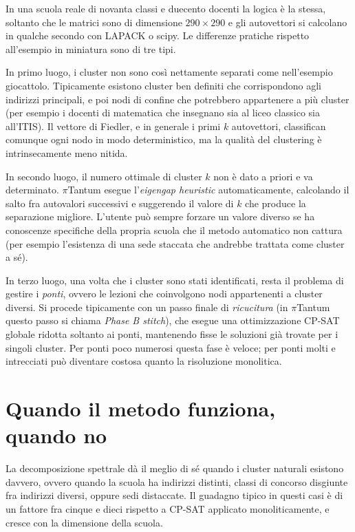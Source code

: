 In una scuola reale di novanta classi e duecento docenti la
logica \`e la stessa, soltanto che le matrici sono di
dimensione $290 \times 290$ e gli autovettori si calcolano
in qualche secondo con LAPACK o scipy. Le differenze
pratiche rispetto all'esempio in miniatura sono di tre
tipi.

In primo luogo, i cluster non sono cos\`i nettamente
separati come nell'esempio giocattolo. Tipicamente esistono
cluster ben definiti che corrispondono agli indirizzi
principali, e poi nodi di confine che potrebbero
appartenere a pi\`u cluster (per esempio i docenti di
matematica che insegnano sia al liceo classico sia
all'ITIS). Il vettore di Fiedler, e in generale i primi $k$
autovettori, classifican comunque ogni nodo in modo
deterministico, ma la qualit\`a del clustering \`e
intrinsecamente meno nitida.

In secondo luogo, il numero ottimale di cluster $k$ non \`e
dato a priori e va determinato. $\pi$Tantum esegue
l'\emph{eigengap heuristic} automaticamente, calcolando il
salto fra autovalori successivi e suggerendo il valore di
$k$ che produce la separazione migliore. L'utente pu\`o
sempre forzare un valore diverso se ha conoscenze specifiche
della propria scuola che il metodo automatico non cattura
(per esempio l'esistenza di una sede staccata che andrebbe
trattata come cluster a s\'e).

In terzo luogo, una volta che i cluster sono stati
identificati, resta il problema di gestire i \emph{ponti},
ovvero le lezioni che coinvolgono nodi appartenenti a
cluster diversi. Si procede tipicamente con un passo finale
di \emph{ricucitura} (in $\pi$Tantum questo passo si chiama
\emph{Phase B stitch}), che esegue una ottimizzazione CP-SAT
globale ridotta soltanto ai ponti, mantenendo fisse le
soluzioni gi\`a trovate per i singoli cluster. Per ponti
poco numerosi questa fase \`e veloce; per ponti molti e
intrecciati pu\`o diventare costosa quanto la risoluzione
monolitica.

\section{Quando il metodo funziona, quando no}

\begin{ideabox}
La decomposizione spettrale d\`a il meglio di s\'e quando i
cluster naturali esistono davvero, ovvero quando la scuola
ha indirizzi distinti, classi di concorso disgiunte fra
indirizzi diversi, oppure sedi distaccate. Il guadagno
tipico in questi casi \`e di un fattore fra cinque e dieci
rispetto a CP-SAT applicato monoliticamente, e cresce con la
dimensione della scuola.
\end{ideabox}

